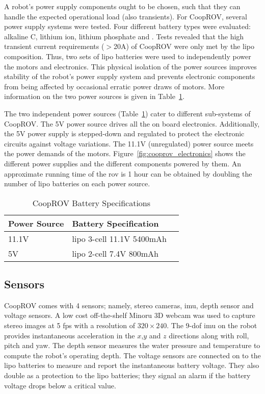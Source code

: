 A robot's power supply components ought to be chosen, such that they can handle the expected operational load (also transients). For CoopROV, several power supply systems were tested. Four different battery types were evaluated: alkaline C, lithium ion, lithium phosphate and . Tests revealed that the high transient current requirements ($>$20A) of CoopROV were only met by the \gls{lipo} composition. Thus, two sets of \gls{lipo} batteries were used to independently power the motors and electronics. This physical isolation of the power sources improves stability of the robot's power supply system and prevents electronic components from being affected by occasional erratic power draws of motors. More information on the two power sources is given in Table~\ref{tab:cooprov_battery}.

The two independent power sources (Table~\ref{tab:cooprov_battery}) cater to different sub-systems of CoopROV. The 5V power source drives all the on board electronics. Additionally, the 5V power supply is stepped-down and regulated to protect the electronic circuits against voltage variations.  The 11.1V  (unregulated) power source meets the power demands of the motors. Figure~\ref{fig:cooprov_electronics} shows the different power supplies  and the different components powered by them. An approximate running time of the \gls{rov} is 1 hour 
can be obtained by doubling the number of \gls{lipo} batteries on each power source.
%
\begin{table}
\centering
\caption{CoopROV Battery Specifications}
  \begin{tabular}{lll} 
  \toprule
  Power Source	&Battery Specification\\
  \midrule
  11.1V	&\gls{lipo} 3-cell 11.1V 5400mAh\\
  5V	&\gls{lipo} 2-cell 7.4V 800mAh\\
  \bottomrule
  \end{tabular}
  \label{tab:cooprov_battery}
\end{table}


\subsection{Sensors}

CoopROV comes with 4 sensors; namely, stereo cameras, \gls{imu}, depth sensor and voltage sensors. A low cost off-the-shelf Minoru 3D webcam \cite{minoru} was used to capture stereo images at 5 \gls{fps} with a resolution of $320\times 240$. The 9-\gls{dof} \gls{imu} on the robot provides instantaneous acceleration in the $x$,$y$ and $z$ directions along with roll, pitch and yaw. The depth sensor measures the water pressure and temperature to compute the robot's operating depth. The voltage sensors are connected on to the \gls{lipo} batteries to measure and report the instantaneous battery voltage. They also double as a protection to the \gls{lipo} batteries; they signal an alarm if the battery voltage drops below a critical value.

